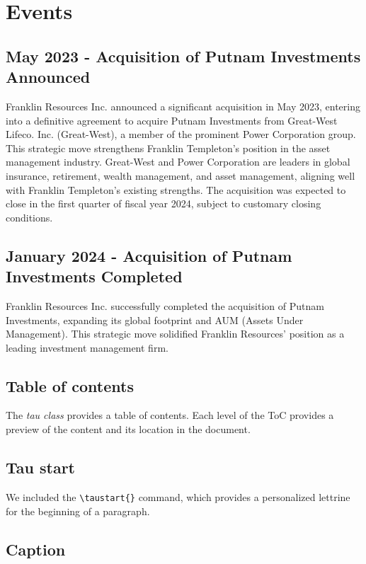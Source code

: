 \documentclass[9pt,a4paper,twoside]{tau}
\begin{document}
\section{Events}

    \subsection{May 2023 - Acquisition of Putnam Investments Announced}
	
        Franklin Resources Inc. announced a significant acquisition in May 2023, entering into a definitive agreement to acquire Putnam Investments from Great-West Lifeco. Inc. (Great-West), a member of the prominent Power Corporation group. This strategic move strengthens Franklin Templeton's position in the asset management industry. Great-West and Power Corporation are leaders in global insurance, retirement, wealth management, and asset management, aligning well with Franklin Templeton's existing strengths. The acquisition was expected to close in the first quarter of fiscal year 2024, subject to customary closing conditions.

    \subsection{January 2024 - Acquisition of Putnam Investments Completed}
	
        Franklin Resources Inc. successfully completed the acquisition of Putnam Investments, expanding its global footprint and AUM (Assets Under Management). This strategic move solidified Franklin Resources' position as a leading investment management firm.

    \subsection{Table of contents}

        The \textit{tau class} provides a table of contents. Each level of the ToC provides a preview of the content and its location in the document.

    \subsection{Tau start}

        We included the \verb*|\taustart{}| command, which provides a personalized lettrine for the beginning of a paragraph.
        
    \subsection{Caption}
\end{document}

